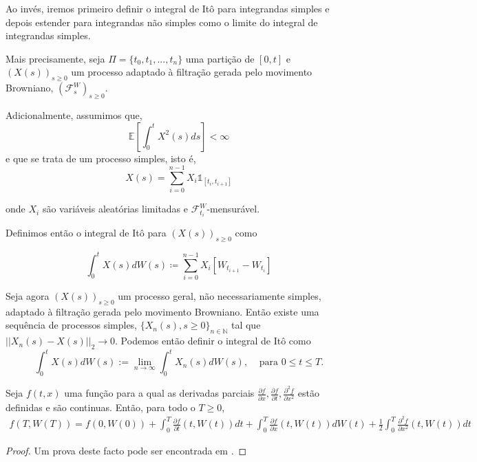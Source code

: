 \documentclass{article}
\begin{document}
\vspace{0.5cm}

Ao invés, iremos primeiro definir o integral de Itô para integrandas simples e depois estender para integrandas não simples como o limite do integral de integrandas simples. 

Mais precisamente, seja $\Pi=\{t_0,t_1,...,t_n\}$ uma partição de $[0,t]$ e $(X(s))_{s \geq 0}$ um processo adaptado à filtração gerada pelo movimento Browniano, $(\mathcal{F}_s^W)_{s \geq 0}$.

Adicionalmente, assumimos que,
$$\mathbb{E} \left[ \int_0^tX^2(s)ds \right]< \infty$$
e que se trata de um processo simples, isto é,
$$X(s)=\sum_{i=0}^{n-1}X_i \mathds{1}_{[t_i,t_{i+1}]}$$


onde $X_i$ são variáveis aleatórias limitadas e  $\mathcal{F}^W_{t_i}$-mensurável.

Definimos então o integral de Itô para $(X(s))_{s \geq 0}$ como

\begin{equation*}
    \int_0^tX(s)dW(s) \coloneq \sum_{i=0}^{n-1} X_i[W_{t_{i+1}}-W_{t_i}]
\end{equation*}

\vspace{0.5cm}

Seja agora $(X(s))_{s\geq 0}$ um processo geral, não necessariamente simples, adaptado à filtração gerada pelo movimento Browniano. Então existe uma sequência de processos simples, $\{X_n(s), s \geq 0\}_{n \in \mathbb{N}}$ tal que $||X_n(s)-X(s)||_2 \rightarrow 0$. Podemos então definir o integral de Itô como
$$\int_0^tX(s)dW(s):=\lim_{n \rightarrow\infty} \int_0^tX_n(s)dW(s),\;\;\;\; \text{para } 0\leq t \leq T.$$
    

\begin{thm}
    Seja $f(t,x)$ uma função para a qual as derivadas parciais $\frac{\partial f}{\partial x},\frac{\partial f}{\partial t},\frac{\partial^2 f}{\partial x^2}$ estão definidas e são continuas. Então, para todo o $T \geq 0$,
    \begin{align*}
        f(T,W(T))=f(0,W(0))+\int_0^T\frac{\partial f}{\partial t}(t,W(t))dt+\int_0^T\frac{\partial f}{\partial x}(t,W(t))dW(t)+\frac{1}{2}\int_0^T\frac{\partial^2 f}{\partial x^2}(t,W(t))dt
    \end{align*}
\end{thm}
\begin{proof}
    Um prova deste facto pode ser encontrada em \cite{Shreve2004}.
\end{proof}
\end{document}

